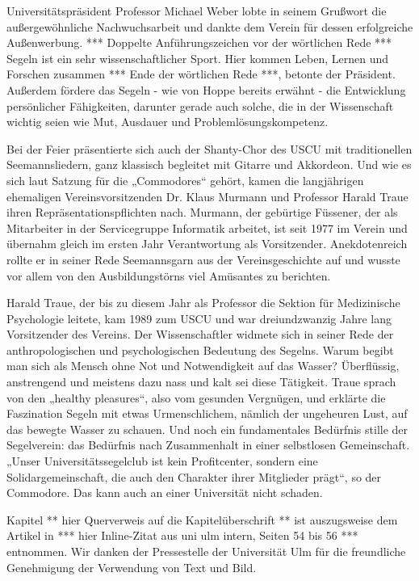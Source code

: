
Universitätspräsident Professor Michael Weber lobte in seinem Grußwort die außergewöhnliche Nachwuchsarbeit und dankte dem Verein für dessen erfolgreiche Außenwerbung. *** Doppelte Anführungszeichen vor der wörtlichen Rede *** Segeln ist ein sehr wissenschaftlicher Sport. Hier kommen Leben, Lernen und Forschen zusammen *** Ende der wörtlichen Rede ***, betonte der Präsident. Außerdem fördere das Segeln - wie von Hoppe bereits erwähnt - die Entwicklung persönlicher Fähigkeiten, darunter gerade auch solche, die in der Wissenschaft wichtig seien wie Mut, Ausdauer und Problemlösungskompetenz. 

Bei der Feier präsentierte sich auch der Shanty-Chor des USCU mit traditionellen Seemannsliedern, ganz klassisch begleitet mit Gitarre und Akkordeon. Und wie es sich laut Satzung für die „Commodores“ gehört, kamen die langjährigen ehemaligen Vereinsvorsitzenden Dr. Klaus Murmann und Professor Harald Traue ihren Repräsentationspflichten nach. Murmann, der gebürtige Füssener, der als Mitarbeiter in der Servicegruppe Informatik arbeitet, ist seit 1977 im Verein und übernahm gleich im ersten Jahr Verantwortung als Vorsitzender. Anekdotenreich rollte er in seiner Rede Seemannsgarn aus der Vereinsgeschichte auf und wusste vor allem von den Ausbildungstörns viel Amüsantes zu berichten. 

Harald Traue, der bis zu diesem Jahr als Professor die Sektion für Medizinische Psychologie leitete, kam 1989 zum USCU und war dreiundzwanzig Jahre lang Vorsitzender des Vereins. Der Wissenschaftler widmete sich in seiner Rede der anthropologischen und psychologischen Bedeutung des Segelns. Warum begibt man sich als Mensch ohne Not und Notwendigkeit auf das Wasser? Überflüssig, anstrengend und meistens dazu nass und kalt sei diese Tätigkeit. Traue sprach von den „healthy pleasures“, also vom gesunden Vergnügen, und erklärte die Faszination Segeln mit etwas Urmenschlichem, nämlich der ungeheuren Lust, auf das bewegte Wasser zu schauen. Und noch ein fundamentales Bedürfnis stille der Segelverein: das Bedürfnis nach Zusammenhalt in einer selbstlosen Gemeinschaft. „Unser Universitätssegelclub ist kein Profitcenter, sondern eine Solidargemeinschaft, die auch den Charakter ihrer Mitglieder prägt“, so der Commodore. Das kann auch an einer Universität nicht schaden. 

Kapitel ** hier Querverweis auf die Kapitelüberschrift ** ist auszugsweise dem Artikel in *** hier Inline-Zitat aus uni ulm intern, Seiten 54 bis 56 *** entnommen. Wir danken der Pressestelle der Universität Ulm für die freundliche Genehmigung der Verwendung von Text und Bild.
